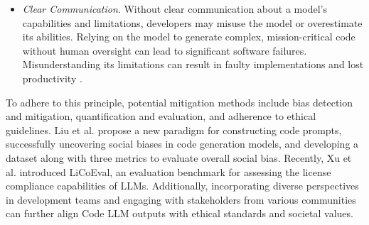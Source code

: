 \begin{itemize}
    \item \textit{Clear Communication}. Without clear communication about a model's capabilities and limitations, developers may misuse the model or overestimate its abilities. Relying on the model to generate complex, mission-critical code without human oversight can lead to significant software failures. Misunderstanding its limitations can result in faulty implementations and lost productivity \cite{ross2023programmer}.
\end{itemize}
To adhere to this principle, potential mitigation methods include bias detection and mitigation, quantification and evaluation, and adherence to ethical guidelines. 
Liu et al. \cite{liu2023uncovering} propose a new paradigm for constructing code prompts, successfully uncovering social biases in code generation models, and developing a dataset along with three metrics to evaluate overall social bias. 
Recently, Xu et al. \cite{xu2024first} introduced LiCoEval, an evaluation benchmark for assessing the license compliance capabilities of LLMs. Additionally, incorporating diverse perspectives in development teams and engaging with stakeholders from various communities can further align Code LLM outputs with ethical standards and societal values.


